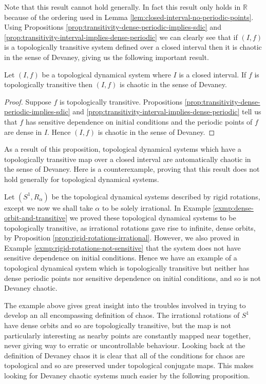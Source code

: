 Note that this result cannot hold generally. In fact this result only holds in $\mathbb{R}$ because of the ordering used in Lemma \ref{lem:closed-interval-no-periodic-points}. Using Propositions \ref{prop:transitivity-dense-periodic-implies-sdic} and \ref{prop:transitivity-interval-implies-dense-periodic} we can clearly see that if $(I, f)$ is a topologically transitive system defined over a closed interval then it is chaotic in the sense of Devaney, giving us the following important result.

\begin{prop}\label{prop:chaotic-transitive}
    Let $(I, f)$ be a topological dynamical system where $I$ is a closed interval. If $f$ is topologically transitive then $(I, f)$ is chaotic in the sense of Devaney.
    \begin{proof}
        Suppose $f$ is topologically transitive. Propositions \ref{prop:transitivity-dense-periodic-implies-sdic} and \ref{prop:transitivity-interval-implies-dense-periodic} tell us that $f$ has sensitive dependence on initial conditions and the periodic points of $f$ are dense in $I$. Hence $(I, f)$ is chaotic in the sense of Devaney.
    \end{proof}
\end{prop}

As a result of this proposition, topological dynamical systems which have a topologically transitive map over a closed interval are automatically chaotic in the sense of Devaney. Here is a counterexample, proving that this result does not hold generally for topological dynamical systems.

\begin{exmp}
    Let $(S^1, R_\alpha)$ be the topological dynamical systems described by rigid rotations, except we now we shall take $\alpha$ to be solely irrational. In Example \ref{exmp:dense-orbit-and-transitive} we proved these topological dynamical systems to be topologically transitive, as irrational rotations gave rise to infinite, dense orbits, by Proposition \ref{prop:rigid-rotations-irrational}. However, we also proved in Example \ref{exmp:rigid-rotations-not-sensitive} that the system does not have sensitive dependence on initial conditions. Hence we have an example of a topological dynamical system which is topologically transitive but neither has dense periodic points nor sensitive dependence on initial conditions, and so is not Devaney chaotic.
\end{exmp}

The example above gives great insight into the troubles involved in trying to develop an all encompassing definition of chaos. The irrational rotations of $S^1$ have dense orbits and so are topologically transitive, but the map is not particularly interesting as nearby points are constantly mapped near together, never giving way to erratic or uncontrollable behaviour. Looking back at the definition of Devaney chaos it is clear that all of the conditions for chaos are topological and so are preserved under topological conjugate maps. This makes looking for Devaney chaotic systems much easier by the following proposition.


